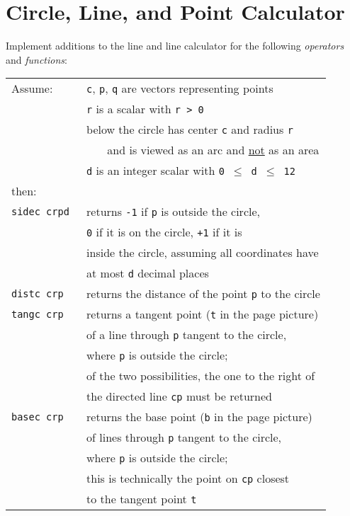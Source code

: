 \documentclass[12pt]{article}
\begin{document}
\section{Circle, Line, and Point Calculator}
Implement additions to the line and line calculator for
the following {\em operators} and {\em functions}:
\begin{center}
\begin{tabular}{l@{~~~~~}l}
Assume: & {\tt c}, {\tt p}, {\tt q} are vectors representing points \\
	& {\tt r} is a scalar with {\tt r > 0} \\
	& below the circle has center {\tt c} and radius {\tt r} \\
	& ~~~ and is viewed as an arc and \underline{not} as an area \\
	& {\tt d} is an integer scalar with {\tt 0 $\leq$ d $\leq$ 12} \\
then: \\[1ex]
\tt sidec~crpd & returns {\tt -1} if {\tt p} is outside the circle, \\
               & {\tt 0} if it is on the circle, {\tt +1} if it is \\
	       & inside the circle, assuming all coordinates have \\
	       & at most {\tt d} decimal places \\
\tt distc crp  & returns the distance of the point {\tt p} to the
                 circle \\
\tt tangc crp  & returns a tangent point ({\tt t} in the page
                 \pageref{TANGENT-PICTURE} picture) \\
               & of a line through {\tt p} tangent to the circle, \\
	       & where {\tt p} is outside the circle; \\
	       & of the two possibilities, the one to the right of \\
	       & the directed line {\tt cp} must be returned \\
\tt basec crp  & returns the base point ({\tt b} in the page
                 \pageref{TANGENT-PICTURE} picture) \\
               & of lines through {\tt p} tangent to the circle, \\
	       & where {\tt p} is outside the circle; \\
	       & this is technically the point on {\tt cp} closest \\
	       & to the tangent point {\tt t} \\

\end{tabular}
\end{center}
\end{document}
